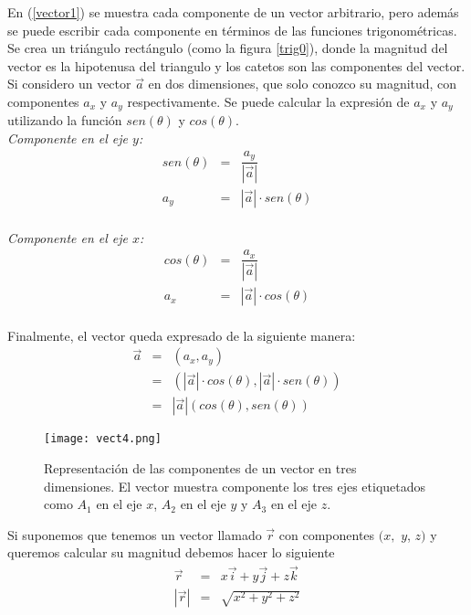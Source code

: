 En (\ref{vector1}) se muestra cada componente de un vector arbitrario, pero además se puede escribir cada componente en términos de las funciones trigonométricas. Se crea un triángulo rectángulo (como la figura \ref{trig0}), donde la magnitud del vector es la hipotenusa del triangulo y los catetos son las componentes del vector.\\
Si considero un vector $\vec{a}$ en dos dimensiones, que solo conozco su magnitud, con componentes $a_{x}$ y $a_{y}$ respectivamente. Se puede calcular la expresión de $a_{x}$ y $a_{y}$ utilizando la función $sen(\theta)$ y $cos(\theta)$.\\

\textit{Componente en el eje $y$:}
\begin{eqnarray}
sen(\theta)&=&\dfrac{a_{y}}{|\vec{a}|}\nonumber\\
a_{y}&=&|\vec{a}|\cdot sen(\theta)
\end{eqnarray}\\

\textit{Componente en el eje $x$:}
\begin{eqnarray}
cos(\theta)&=&\dfrac{a_{x}}{|\vec{a}|}\nonumber\\
a_{x}&=&|\vec{a}|\cdot cos(\theta)
\end{eqnarray}\\

Finalmente, el vector queda expresado de la siguiente manera:
\begin{eqnarray}
\vec{a}&=&(a_{x},a_{y})\\
&=&(|\vec{a}|\cdot cos(\theta),|\vec{a}|\cdot sen(\theta))\\
&=&|\vec{a}|(cos(\theta),sen(\theta))
\end{eqnarray}

 \begin{center}
\begin{figure}[h!]
\centering
\texttt{[image: vect4.png]}
\caption[Representación de las componentes de un vector.]{Representación de las componentes de un vector en tres dimensiones. El vector muestra componente los tres ejes etiquetados como $A_{1}$ en el eje $x$, $A_{2}$ en el eje $y$ y $A_{3}$ en el eje $z$.} \label{vect4}
\end{figure}
\end{center}


 Si suponemos que tenemos un vector llamado $\vec{r}$ con componentes $(x,$ $y$, $z)$ y queremos calcular su magnitud debemos hacer lo siguiente
\begin{eqnarray*}
\vec{r}&=&x\vec{i}+y\vec{j}+z\vec{k}\\
|\vec{r}|&=&\sqrt{x^{2}+y^{2}+z^{2}}
\end{eqnarray*} 



